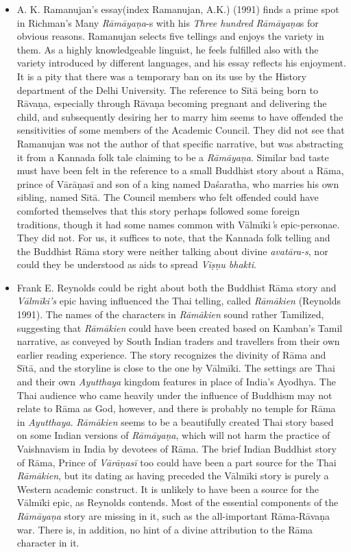\begin{itemize}
 \item A. K. Ramanujan’s essay(index Ramanujan, A.K.) (1991) finds a prime spot in Richman’s Many \textit{Rāmāyaṇa}-s with his \textit{Three hundred} \textit{Rāmāyaṇa}s for obvious reasons. Ramanujan selects five tellings and enjoys the variety in them. As a highly knowledgeable linguist, he feels fulfilled also with the variety introduced by different languages, and his essay reflects his enjoyment. It is a pity that there was a temporary ban on its use by the History department of the Delhi University. The reference to Sītā being born to Rāvaṇa, especially through Rāvaṇa becoming pregnant and delivering the child, and subsequently desiring her to marry him seems to have offended the sensitivities of some members of the Academic Council. They did not see that Ramanujan was not the author of that specific narrative, but was abstracting it from a Kannada folk tale claiming to be a \textit{Rāmāyaṇa}. Similar bad taste must have been felt in the reference to a small Buddhist story about a Rāma, prince of Vārāṇasī and son of a king named Daśaratha, who marries his own sibling, named Sītā. The Council members who felt offended could have comforted themselves that this story perhaps followed some foreign traditions, though it had some names common with Vālmīki\textit{’}s epic-personae. They did not. For us, it suffices to note, that the Kannada folk telling and the Buddhist Rāma story were neither talking about divine \textit{avatāra-s}, nor could they be understood as aids to spread \textit{Viṣṇu bhakti}.

 \item Frank E. Reynolds could be right about both the Buddhist Rāma story and \textit{Vālmīki’s} epic having influenced the Thai telling, called \textit{Rāmākien} (Reynolds 1991). The names of the characters in \textit{Rāmākien} sound rather Tamilized, suggesting that \textit{Rāmākien} could have been created based on Kamban’s Tamil narrative, as conveyed by South Indian traders and travellers from their own earlier reading experience. The story recognizes the divinity of Rāma and Sītā, and the storyline is close to the one by Vālmīki. The settings are Thai and their own \textit{Ayutthaya} kingdom features in place of India’s Ayodhya. The Thai audience who came heavily under the influence of Buddhism may not relate to Rāma as God, however, and there is probably no temple for Rāma in \textit{Ayutthaya}. \textit{Rāmākien} seems to be a beautifully created Thai story based on some Indian versions of \textit{Rāmāyaṇa}, which will not harm the practice of Vaishnavism in India by devotees of Rāma. The brief Indian Buddhist story of Rāma, Prince of \textit{Vārāṇasī} too could have been a part source for the Thai \textit{Rāmākien}, but its dating as having preceded the Vālmīki story is purely a Western academic construct. It is unlikely to have been a source for the Vālmīki epic, as Reynolds contends. Most of the essential components of the \textit{Rāmāyaṇa} story are missing in it, such as the all-important Rāma-Rāvaṇa war. There is, in addition, no hint of a divine attribution to the Rāma character in it.


\end{itemize}
